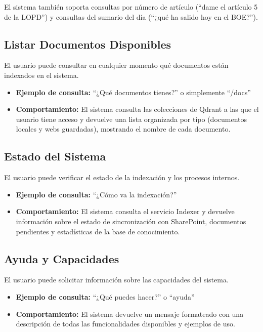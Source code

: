 El sistema también soporta consultas por número de artículo (``dame el artículo 5 de la LOPD'') y consultas del sumario del día (``¿qué ha salido hoy en el BOE?'').

\subsection{Listar Documentos Disponibles}
\label{subsec:modo-listar}

El usuario puede consultar en cualquier momento qué documentos están indexados en el sistema.

\begin{itemize}
    \item \textbf{Ejemplo de consulta:} ``¿Qué documentos tienes?'' o simplemente ``/docs''
    \item \textbf{Comportamiento:} El sistema consulta las colecciones de Qdrant a las que el usuario tiene acceso y devuelve una lista organizada por tipo (documentos locales y webs guardadas), mostrando el nombre de cada documento.
\end{itemize}

\subsection{Estado del Sistema}
\label{subsec:modo-status}

El usuario puede verificar el estado de la indexación y los procesos internos.

\begin{itemize}
    \item \textbf{Ejemplo de consulta:} ``¿Cómo va la indexación?''
    \item \textbf{Comportamiento:} El sistema consulta el servicio Indexer y devuelve información sobre el estado de sincronización con SharePoint, documentos pendientes y estadísticas de la base de conocimiento.
\end{itemize}

\subsection{Ayuda y Capacidades}
\label{subsec:modo-ayuda}

El usuario puede solicitar información sobre las capacidades del sistema.

\begin{itemize}
    \item \textbf{Ejemplo de consulta:} ``¿Qué puedes hacer?'' o ``ayuda''
    \item \textbf{Comportamiento:} El sistema devuelve un mensaje formateado con una descripción de todas las funcionalidades disponibles y ejemplos de uso.
\end{itemize}

